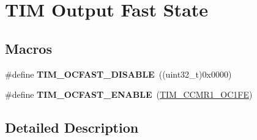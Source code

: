 \hypertarget{group___t_i_m___output___fast___state}{\section{T\-I\-M Output Fast State}
\label{group___t_i_m___output___fast___state}
}
\subsection*{Macros}
\begin{DoxyCompactItemize}
\item 
\hypertarget{group___t_i_m___output___fast___state_ga71429b63f2a6604171ccfd3a91ccf43a}{\#define {\bfseries T\-I\-M\-\_\-\-O\-C\-F\-A\-S\-T\-\_\-\-D\-I\-S\-A\-B\-L\-E}~((uint32\-\_\-t)0x0000)}\label{group___t_i_m___output___fast___state_ga71429b63f2a6604171ccfd3a91ccf43a}

\item 
\hypertarget{group___t_i_m___output___fast___state_ga445a2c0633ac649e816cf7a16b716d61}{\#define {\bfseries T\-I\-M\-\_\-\-O\-C\-F\-A\-S\-T\-\_\-\-E\-N\-A\-B\-L\-E}~(\hyperlink{group___peripheral___registers___bits___definition_gab9c5878e85ce02c22d8a374deebd1b6e}{T\-I\-M\-\_\-\-C\-C\-M\-R1\-\_\-\-O\-C1\-F\-E})}\label{group___t_i_m___output___fast___state_ga445a2c0633ac649e816cf7a16b716d61}

\end{DoxyCompactItemize}


\subsection{Detailed Description}
